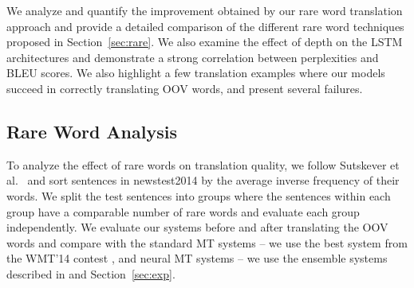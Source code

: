 
We analyze and quantify the improvement obtained by our rare word translation approach and provide a detailed 
comparison of the different rare word techniques proposed in Section~\ref{sec:rare}. We also examine the effect of 
depth on the LSTM architectures and demonstrate a strong correlation between perplexities and BLEU scores. We also highlight 
a few translation examples where our models succeed in correctly translating OOV words, and present 
several failures.

\subsection{Rare Word Analysis}
\begin{sloppypar}
To analyze the effect of rare words on translation quality, 
we follow Sutskever et al.~\cite{sutskever14} and sort sentences in 
newstest2014 by the average inverse frequency of their words. 
We split the test sentences into groups where the sentences within each group have a comparable number of rare words
 and evaluate each group independently. We evaluate our 
systems before and after translating the OOV words and compare with 
the standard MT systems -- we use the best system from the WMT'14 contest \cite{durrani-EtAl:2014:W14-33},
and neural MT systems -- we use the ensemble systems described in \cite{sutskever14} and Section~\ref{sec:exp}.
\end{sloppypar}

